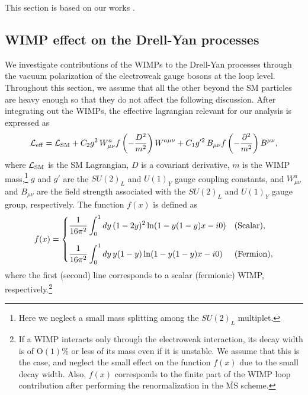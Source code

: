 \documentclass[12pt,twoside,book]{article}
\begin{document}
This section is based on our works \cite{Chigusa:2018vxz, Abe:2019egv}.


\subsection{WIMP effect on the Drell-Yan processes}
\label{sec:WIMP}

We investigate contributions of the WIMPs to the Drell-Yan processes through the vacuum polarization of the electroweak gauge bosons at the loop level.
Throughout this section, we assume that all the other beyond the SM particles are heavy enough so that they do not affect the following discussion.
After integrating out the WIMPs, the effective lagrangian relevant for our analysis is expressed as
\begin{align}
 \mathcal{L}_{\rm eff} = \mathcal{L}_{\rm SM} + C_2 g^2\, W_{\mu \nu}^a
 f\left(-\frac{D^2}{m^2}\right) W^{a\mu\nu} + C_1 g'^2\, B_{\mu\nu}
 f\left(-\frac{\partial^2}{m^2}\right) B^{\mu\nu},\label{eq_lag}
\end{align}
where $\mathcal{L}_{\rm SM}$ is the SM Lagrangian, $D$ is a covariant derivative, $m$ is the WIMP mass,\footnote
{
  Here we neglect a small mass splitting among the $SU(2)_L$ multiplet.
}
$g$ and $g'$ are the $SU(2)_L$ and $U(1)_Y$ gauge coupling constants, and $W_{\mu\nu}^a$ and $B_{\mu\nu}$ are the field strength associated with the $SU(2)_L$ and $U(1)_Y$ gauge group, respectively.
The function $f(x)$ is defined as \cite{Matsumoto:2017vfu}
\begin{align}
  f(x) = \begin{cases}
    \displaystyle{\frac{1}{16\pi^2} \int_0^1 dy\, (1-2y)^2 \ln (1-
    y(1-y)x - i0)} & {\rm (Scalar)},\\[5mm]
    \displaystyle{\frac{1}{16\pi^2} \int_0^1 dy\, y(1-y) \ln (1 -
	  y(1-y)x - i0)} & {\rm (Fermion)},
  \end{cases}\label{eq_f}
\end{align}
where the first (second) line corresponds to a scalar (fermionic) WIMP, respectively.\footnote
{
  If a WIMP interacts only through the electroweak interaction, its decay width is of $\mathrm{O}(1)\%$ or less of its mass even if it is unstable.
  We assume that this is the case, and neglect the small effect on the function $f(x)$ due to the small decay width.
  Also, $f(x)$ corresponds to the finite part of the WIMP loop contribution after performing the renormalization in the $\overline{\mathrm{MS}}$ scheme.
}
\end{document}
